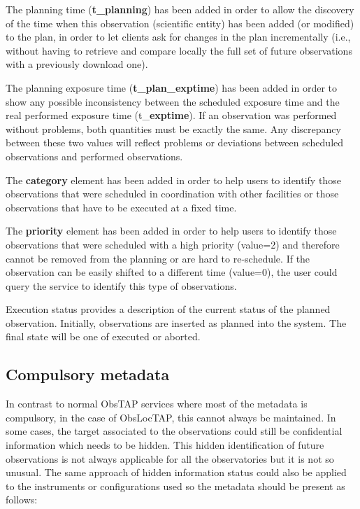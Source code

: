 \documentclass[11pt,a4paper]{ivoa}
\begin{document}
The planning time (\textbf{t\_planning}) has been added in order to allow the discovery 
of the time when this observation (scientific entity) has been added (or modified) to 
the plan, in order to let clients ask for changes in the plan incrementally (i.e., 
without having to retrieve and compare locally the full set of future observations 
with a previously download one).

The planning exposure time (\textbf{t\_plan\_exptime}) has been added in order to 
show any possible inconsistency between the scheduled exposure time and the real 
performed exposure time (t\_\textbf{exptime}). If an observation was performed without 
problems, both quantities must be exactly the same. Any discrepancy between these two 
values will reflect problems or deviations between scheduled observations and performed 
observations.

The \textbf{category} element has been added in order to help users to identify those 
observations that were scheduled in coordination with other facilities or those 
observations that have to be executed at a fixed time.

The \textbf{priority} element has been added in order to help users to identify those 
observations that were scheduled with a high priority (value=2) and therefore cannot be 
removed from the planning or are hard to re-schedule. If the observation can be easily 
shifted to a different time (value=0), the user could query the service to identify this 
type of observations.

Execution status provides a description of the current status of the planned observation. 
Initially, observations are inserted as planned into the system. The final state will 
be one of executed or aborted.

\subsection{Compulsory metadata}
In contrast to normal ObsTAP services where most of the metadata is compulsory, in the 
case of ObsLocTAP, this cannot always be maintained. In some cases, the target associated 
to the observations could still be confidential information which needs to be hidden. 
This hidden identification of future observations is not always applicable for all the 
observatories but it is not so unusual. The same approach of hidden information status 
could also be applied to the instruments or configurations used so the metadata should 
be present as follows:
\end{document}
